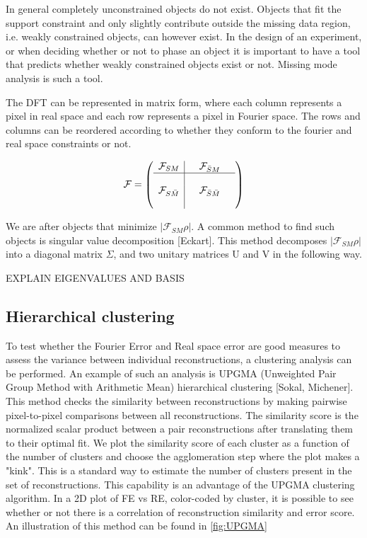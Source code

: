 In general completely unconstrained objects do not exist. Objects that fit the support constraint and only slightly contribute outside the missing data region, i.e. weakly constrained objects, can however exist. In the design of an experiment, or when deciding whether or not to phase an object it is important to have a tool that predicts whether weakly constrained objects exist or not. Missing mode analysis is such a tool.

The DFT can be represented in matrix form, where each column represents a pixel in real space and each row represents a pixel in Fourier space. The rows and columns can be reordered according to whether they conform to the fourier and real space constraints or not.

\begin{equation}\label{equ:F_split}
  \mathcal{F} = 
  \left(\begin{array}{l|lll}
    \mathcal{F}_{SM} & &\mathcal{F}_{\bar{S}M}& \\\hline
    &&&\\
    \mathcal{F}_{S\bar{M}} & & \mathcal{F}_{\bar{S}\bar{M}} &\\
    &&&
  \end{array}\right)
\end{equation}

We are after objects that minimize $|\mathcal{F}_{SM}\rho|$. A common method to find such objects is singular value decomposition [Eckart]. This method decomposes $|\mathcal{F}_{SM}\rho|$ into a diagonal matrix $\Sigma$, and two unitary matrices U and V in the following way.

EXPLAIN EIGENVALUES AND BASIS




\subsection{Hierarchical clustering}
To test whether the Fourier Error and Real space error are good measures to assess the variance between individual reconstructions, a clustering analysis can be performed. An example of such an analysis is UPGMA (Unweighted Pair Group Method with Arithmetic Mean) hierarchical clustering [Sokal, Michener]. This method checks the similarity between reconstructions by making pairwise pixel-to-pixel comparisons between all reconstructions. The similarity score is the normalized scalar product between a pair reconstructions after translating them to their optimal fit. We plot the similarity score of  each cluster as a function of the number of clusters and choose the agglomeration step where the plot makes a "kink". This is a standard way to estimate the number of clusters present in the set of reconstructions. This capability is an advantage of the UPGMA clustering algorithm. In a 2D plot of FE vs RE, color-coded by cluster, it is possible to see whether or not there is a correlation of reconstruction similarity and error score. An illustration of this method can be found in \ref{fig:UPGMA}
 
